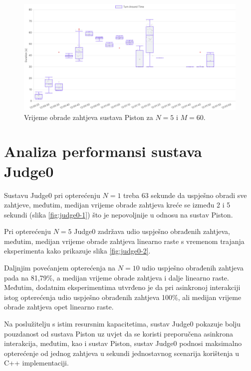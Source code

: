 \documentclass[times, utf8, diplomski]{fer}
\begin{document}
\begin{figure}[htb]
	\centering
	\includegraphics[width=\textwidth]{images/Piston TAT for 5 5s.png}
	\caption{
		Vrijeme obrade zahtjeva sustava Piston za $N=5$ i $M=60$.
	}
	\label{fig:piston-2}
\end{figure}

\pagebreak

\section{Analiza performansi sustava Judge0}
Sustavu Judge0 pri opterećenju $N=1$ treba 63 sekunde da uspješno obradi sve zahtjeve, međutim, medijan vrijeme obrade zahtjeva kreće se između 2 i 5 sekundi (slika \ref{fig:judge0-1}) što je nepovoljnije u odnosu na sustav Piston. 

Pri opterećenju $N=5$ Judge0 zadržava udio uspješno obrađenih zahtjeva, međutim, medijan vrijeme obrade zahtjeva linearno raste s vremenom trajanja eksperimenta kako prikazuje slika \ref{fig:judge0-2}.

Daljnjim povećanjem opterećenja na $N=10$ udio uspješno obrađenih zahtjeva pada na 81,79\%, a medijan vrijeme obrade zahtjeva i dalje linearno raste. Međutim, dodatnim eksperimentima utvrđeno je da pri asinkronoj interakciji istog opterećenja udio uspješno obrađenih zahtjeva 100\%, ali medijan vrijeme obrade zahtjeva opet linearno raste.

Na poslužitelju s istim resursnim kapacitetima, sustav Judge0 pokazuje bolju pouzdanost od sustava Piston uz uvjet da se koristi preporučena asinkrona interakcija, međutim, kao i sustav Piston, sustav Judge0 podnosi maksimalno opterećenje od jednog zahtjeva u sekundi jednostavnog scenarija korištenja u C++ implementaciji. 
\end{document}
